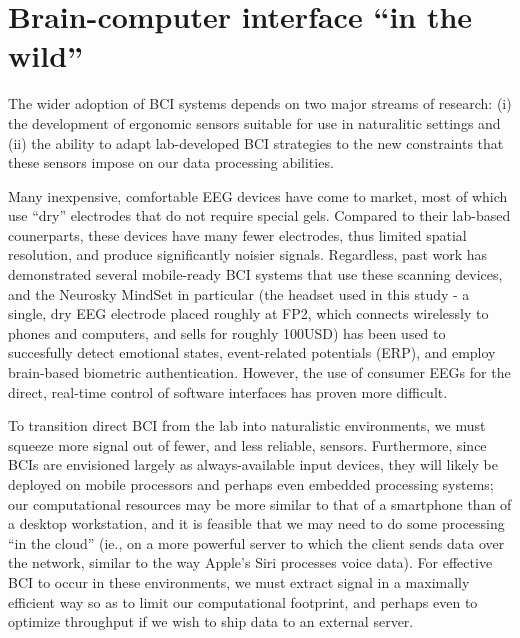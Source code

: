 
\section{Brain-computer interface ``in the wild''}

The wider adoption of BCI systems depends on two major streams of research: (i) the development of ergonomic sensors suitable for use in naturalitic settings and (ii) the ability to adapt lab-developed BCI strategies to the new constraints that these sensors impose on our data processing abilities. 

Many inexpensive, comfortable EEG devices have come to market, most of which use ``dry'' electrodes that do not require special gels. Compared to their lab-based counerparts, these devices have many fewer electrodes, thus limited spatial resolution, and produce significantly noisier signals. Regardless, past work has demonstrated several mobile-ready BCI systems that use these scanning devices, and the Neurosky MindSet in particular (the headset used in this study - a single, dry EEG electrode placed roughly at FP2, which connects wirelessly to phones and computers, and sells for roughly 100USD) has been used to succesfully detect emotional states, event-related potentials (ERP), and employ brain-based biometric authentication. \cite{crowley_evaluating_2010,grierson_better_2011,adams_i_2013} However, the use of consumer EEGs for the direct, real-time control of software interfaces has proven more difficult. \cite{carrino_self-paced_2012,larsen_classification_2011}

To transition direct BCI from the lab into naturalistic environments, we must squeeze more signal out of fewer, and less reliable, sensors. Furthermore, since BCIs are envisioned largely as always-available input devices, they will likely be deployed on mobile processors and perhaps even embedded processing systems; our computational resources may be more similar to that of a smartphone than of a desktop workstation, and it is feasible that we may need to do some processing ``in the cloud'' (ie., on a more powerful server to which the client sends data over the network, similar to the way Apple's Siri processes voice data). For effective BCI to occur in these environments, we must extract signal in a maximally efficient way so as to limit our computational footprint, and perhaps even to optimize throughput if we wish to ship data to an external server.

